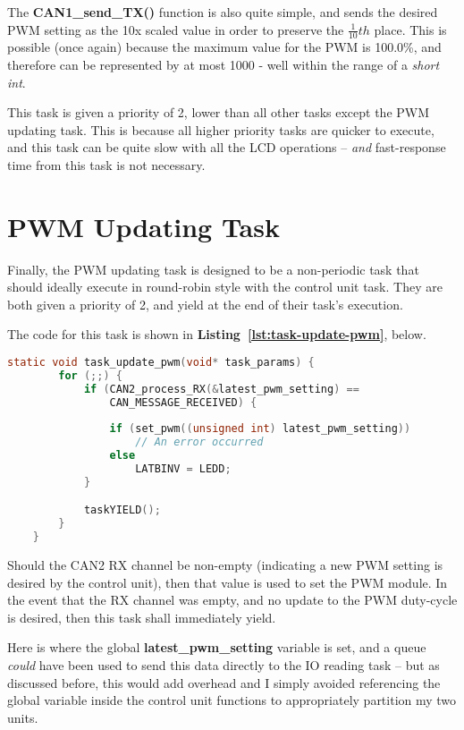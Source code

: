 \documentclass[a4paper, 12pt]{article}
\begin{document}
The \textbf{CAN1\_send\_TX()} function is also quite simple, and sends the desired PWM setting as the 10x scaled value in order to preserve the $\frac{1}{10}th$ place. This is possible (once again) because the maximum value for the PWM is 100.0\%, and therefore can be represented by at most 1000 - well within the range of a \emph{short int}.

This task is given a priority of 2, lower than all other tasks except the PWM updating task. This is because all higher priority tasks are quicker to execute, and this task can be quite slow with all the LCD operations -- \emph{and} fast-response time from this task is not necessary.

\section{PWM Updating Task}
\label{sec:pwm-updating-task}

Finally, the PWM updating task is designed to be a non-periodic task that should ideally execute in round-robin style with the control unit task. They are both given a priority of 2, and yield at the end of their task's execution.

The code for this task is shown in \textbf{Listing~\ref{lst:task-update-pwm}}, below.

	\begin{mdframed}[backgroundcolor=code-gray, roundcorner=10pt,
								innerleftmargin=5, innertopmargin=5, innerbottommargin=5]	
	\begin{lstlisting}[language=C, caption=Control Unit - Operational Mode, tabsize=2, label={lst:task-control-fsm-3}]
	static void task_update_pwm(void* task_params) {
		for (;;) {
			if (CAN2_process_RX(&latest_pwm_setting) ==
				CAN_MESSAGE_RECEIVED) {
			
				if (set_pwm((unsigned int) latest_pwm_setting))
					// An error occurred
				else
					LATBINV = LEDD;
			}

			taskYIELD();
		}
	}
	\end{lstlisting}
	\end{mdframed}
	
Should the CAN2 RX channel be non-empty (indicating a new PWM setting is desired by the control unit), then that value is used to set the PWM module. In the event that the RX channel was empty, and no update to the PWM duty-cycle is desired, then this task shall immediately yield.

Here is where the global \textbf{latest\_pwm\_setting} variable is set, and a queue \emph{could} have been used to send this data directly to the IO reading task -- but as discussed before, this would add overhead and I simply avoided referencing the global variable inside the control unit functions to appropriately partition my two units.
	
\end{document}
